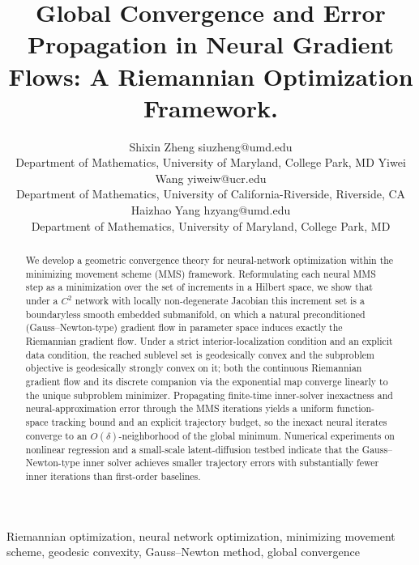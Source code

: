 \documentclass[twoside,11pt]{article}
\title{Global Convergence and Error Propagation in Neural Gradient Flows: A Riemannian Optimization Framework.}
\author{\name Shixin Zheng \email siuzheng@umd.edu \\
       \addr Department of Mathematics, University of Maryland, College Park, MD
       \AND
       \name Yiwei Wang \email yiweiw@ucr.edu \\
       \addr Department of Mathematics, University of California-Riverside, Riverside, CA
       \AND
       \name Haizhao Yang \email hzyang@umd.edu \\
       \addr Department of Mathematics, University of Maryland, College Park, MD}
\begin{document}

\maketitle

\begin{abstract}
We develop a geometric convergence theory for neural-network optimization within the minimizing movement scheme (MMS) framework. Reformulating each neural MMS step as a minimization over the set of increments in a Hilbert space, we show that under a $C^2$ network with locally non-degenerate Jacobian this increment set is a boundaryless smooth embedded submanifold, on which a natural preconditioned (Gauss--Newton-type) gradient flow in parameter space induces exactly the Riemannian gradient flow. Under a strict interior-localization condition and an explicit data condition, the reached sublevel set is geodesically convex and the subproblem objective is geodesically strongly convex on it; both the continuous Riemannian gradient flow and its discrete companion via the exponential map converge linearly to the unique subproblem minimizer. Propagating finite-time inner-solver inexactness and neural-approximation error through the MMS iterations yields a uniform function-space tracking bound and an explicit trajectory budget, so the inexact neural iterates converge to an $O(\delta)$-neighborhood of the global minimum. Numerical experiments on nonlinear regression and a small-scale latent-diffusion testbed indicate that the Gauss--Newton-type inner solver achieves smaller trajectory errors with substantially fewer inner iterations than first-order baselines.
\end{abstract}

\begin{keywords}
Riemannian optimization, neural network optimization, minimizing movement scheme, geodesic convexity, Gauss--Newton method, global convergence
\end{keywords}
\end{document}
